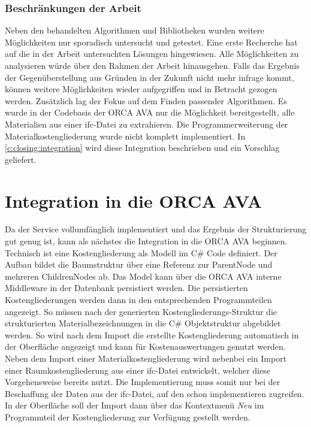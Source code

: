 \subsubsection{Beschränkungen der Arbeit}
Neben den behandelten Algorithmen und Bibliotheken wurden weitere Möglichkeiten nur sporadisch untersucht und getestet. Eine erste Recherche hat auf die in der Arbeit untersuchten Lösungen hingewiesen. Alle Möglichkeiten zu analysieren würde über den Rahmen der Arbeit hinausgehen. Falls das Ergebnis der Gegenüberstellung aus Gründen in der Zukunft nicht mehr infrage kommt, können weitere Möglichkeiten wieder aufgegriffen und in Betracht gezogen werden. Zusätzlich lag der Fokus auf dem Finden passender Algorithmen. Es wurde in der Codebasis der ORCA AVA nur die Möglichkeit bereitgestellt, alle Materialien aus einer \ac{ifc}-Datei zu extrahieren. Die Programmerweiterung der Materialkostengliederung wurde nicht komplett implementiert. In \autoref{c:closing:integration} wird diese Integration beschrieben und ein Vorschlag geliefert.

\section{Integration in die ORCA AVA}
\label{c:closing:integration}
Da der Service vollumfänglich implementiert und das Ergebnis der Strukturierung gut genug ist, kann als nächstes die Integration in die ORCA AVA beginnen. Technisch ist eine Kostengliederung als Modell im C\# Code definiert. Der Aufbau bildet die Baumstruktur über eine Referenz zur ParentNode und mehreren ChildrenNodes ab. Das Model kann über die ORCA AVA interne Middleware in der Datenbank persistiert werden. Die persistierten Kostengliederungen werden dann in den entsprechenden Programmteilen angezeigt. So müssen nach der generierten Kostengliederungs-Struktur die strukturierten Materialbezeichnungen in die C\# Objektstruktur abgebildet werden. So wird nach dem Import die erstellte Kostengliederung automatisch in der Oberfläche angezeigt und kann für Kostenauswertungen genutzt werden. Neben dem Import einer Materialkostengliederung wird nebenbei ein Import einer Raumkostengliederung aus einer \ac{ifc}-Datei entwickelt, welcher diese Vorgehensweise bereits nutzt. Die Implementierung muss somit nur bei der Beschaffung der Daten aus der \ac{ifc}-Datei, auf den schon implementieren  zugreifen. In der Oberfläche soll der Import dann über das Kontextmenü \textit{Neu} im Programmteil der Kostengliederung zur Verfügung gestellt werden. 

